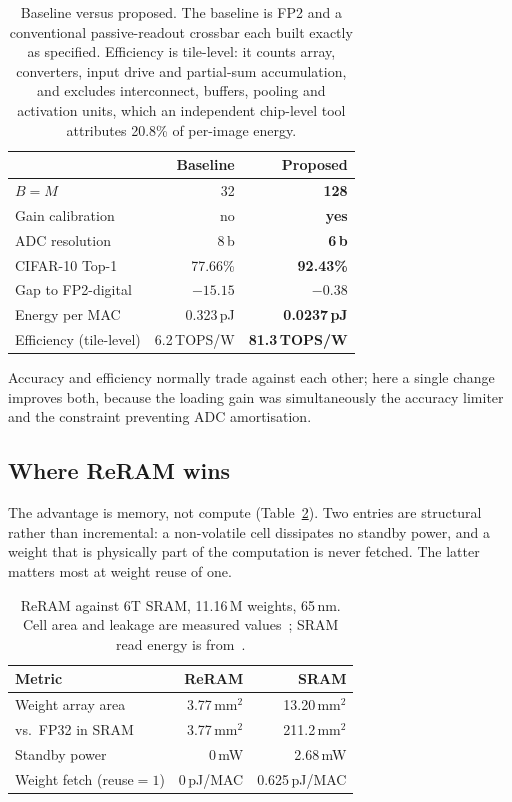 \documentclass[conference,10pt]{IEEEtran}
\begin{document}
\begin{table}[t]
\centering
\caption{Baseline versus proposed. The baseline is FP2 and a conventional
passive-readout crossbar each built exactly as specified. Efficiency is
tile-level: it counts array, converters, input drive and partial-sum
accumulation, and excludes interconnect, buffers, pooling and activation
units, which an independent chip-level tool attributes 20.8\% of per-image
energy.}
\label{tab:eff}
\begin{tabular}{lrr}
\toprule
 & Baseline & \textbf{Proposed} \\
\midrule
$B{=}M$ & 32 & \textbf{128} \\
Gain calibration & no & \textbf{yes} \\
ADC resolution & 8\,b & \textbf{6\,b} \\
\midrule
CIFAR-10 Top-1 & 77.66\% & \textbf{92.43\%} \\
Gap to FP2-digital & $-15.15$ & $\mathbf{-0.38}$ \\
Energy per MAC & 0.323\,pJ & \textbf{0.0237\,pJ} \\
Efficiency (tile-level) & 6.2\,TOPS/W & \textbf{81.3\,TOPS/W} \\
\bottomrule
\end{tabular}
\end{table}

Accuracy and efficiency normally trade against each other; here a single
change improves both, because the loading gain was simultaneously the accuracy
limiter and the constraint preventing ADC amortisation.

\subsection{Where ReRAM wins}

The advantage is memory, not compute (Table~\ref{tab:mem}). Two entries are
structural rather than incremental: a non-volatile cell dissipates no standby
power, and a weight that is physically part of the computation is never
fetched. The latter matters most at weight reuse of one.

\begin{table}[t]
\centering
\caption{ReRAM against 6T SRAM, 11.16\,M weights, 65\,nm. Cell area and
leakage are measured values~\cite{shim2020,verma2008}; SRAM read energy is
from~\cite{horowitz}.}
\label{tab:mem}
\begin{tabular}{lrr}
\toprule
Metric & ReRAM & SRAM \\
\midrule
Weight array area & 3.77\,mm$^2$ & 13.20\,mm$^2$ \\
vs.\ FP32 in SRAM & 3.77\,mm$^2$ & 211.2\,mm$^2$ \\
Standby power & 0\,mW & 2.68\,mW \\
Weight fetch (reuse${=}1$) & 0\,pJ/MAC & 0.625\,pJ/MAC \\
\bottomrule
\end{tabular}
\end{table}
\end{document}
